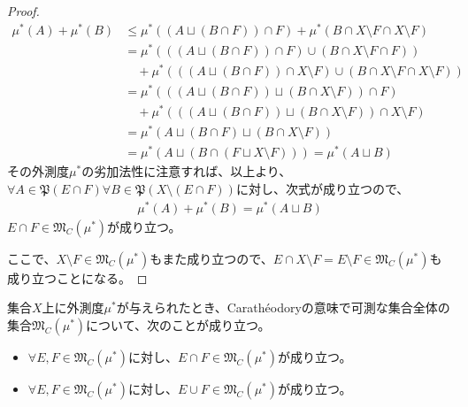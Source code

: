 \documentclass[dvipdfmx]{jsarticle}
\begin{document}
\begin{proof}
\begin{align*}
\mu^{*}(A) + \mu^{*}(B) &\leq \mu^{*}\left( \left( A \sqcup (B \cap F) \right) \cap F \right) + \mu^{*}(B \cap X \setminus F \cap X \setminus F)\\
&= \mu^{*}\left( \left( \left( A \sqcup (B \cap F) \right) \cap F \right) \cup (B \cap X \setminus F \cap F) \right) \\
&\quad + \mu^{*}\left( \left( \left( A \sqcup (B \cap F) \right) \cap X \setminus F \right) \cup (B \cap X \setminus F \cap X \setminus F) \right)\\
&= \mu^{*}\left( \left( \left( A \sqcup (B \cap F) \right) \sqcup (B \cap X \setminus F) \right) \cap F \right) \\
&\quad + \mu^{*}\left( \left( \left( A \sqcup (B \cap F) \right) \sqcup (B \cap X \setminus F) \right) \cap X \setminus F \right)\\
&= \mu^{*}\left( A \sqcup (B \cap F) \sqcup (B \cap X \setminus F) \right)\\
&= \mu^{*}\left( A \sqcup \left( B \cap (F \sqcup X \setminus F) \right) \right) = \mu^{*}(A \sqcup B)
\end{align*}
その外測度$\mu^{*}$の劣加法性に注意すれば、以上より、$\forall A \in \mathfrak{P}(E \cap F)\forall B\in \mathfrak{P}\left( X \setminus (E \cap F) \right)$に対し、次式が成り立つので、
\begin{align*}
\mu^{*}(A) + \mu^{*}(B) = \mu^{*}(A \sqcup B)
\end{align*}
$E \cap F \in \mathfrak{M}_{C}\left( \mu^{*} \right)$が成り立つ。\par
ここで、$X \setminus F \in \mathfrak{M}_{C}\left( \mu^{*} \right)$もまた成り立つので、$E \cap X \setminus F = E \setminus F \in \mathfrak{M}_{C}\left( \mu^{*} \right)$も成り立つことになる。
\end{proof}
\begin{thm}\label{4.5.3.8}
集合$X$上に外測度$\mu^{*}$が与えられたとき、Carathéodoryの意味で可測な集合全体の集合$\mathfrak{M}_{C}\left( \mu^{*} \right)$について、次のことが成り立つ。
\begin{itemize}
\item
  $\forall E,F \in \mathfrak{M}_{C}\left( \mu^{*} \right)$に対し、$E \cap F \in \mathfrak{M}_{C}\left( \mu^{*} \right)$が成り立つ。
\item
  $\forall E,F \in \mathfrak{M}_{C}\left( \mu^{*} \right)$に対し、$E \cup F \in \mathfrak{M}_{C}\left( \mu^{*} \right)$が成り立つ。
\end{itemize}
\end{thm}
\end{document}
